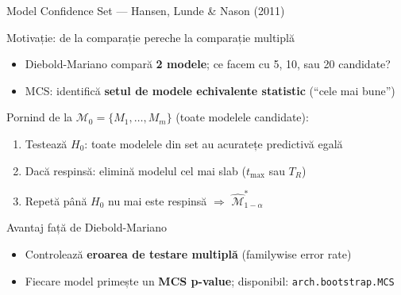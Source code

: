 \documentclass[9pt, aspectratio=169, t]{beamer}
\begin{document}
\begin{frame}{Model Confidence Set --- Hansen, Lunde \& Nason (2011)}
    \small
        \begin{block}{Motivație: de la comparație pereche la comparație multiplă}
            \begin{itemize}
                \item Diebold-Mariano compară \textbf{2 modele}; ce facem cu 5, 10, sau 20 candidate?
                \item MCS: identifică \textbf{setul de modele echivalente statistic} (``cele mai bune'')
            \end{itemize}
        \end{block}
        \vspace{-1mm}
        \begin{defn}
            Pornind de la $\mathcal{M}_0 = \{M_1, \ldots, M_m\}$ (toate modelele candidate):
            \begin{enumerate}\setlength{\itemsep}{-1pt}
                \item Testează $H_0$: toate modelele din set au acuratețe predictivă egală
                \item Dacă respinsă: elimină modelul cel mai slab ($t_{\max}$ sau $T_R$)
                \item Repetă până $H_0$ nu mai este respinsă $\Rightarrow$ $\hat{\mathcal{M}}^*_{1-\alpha}$
            \end{enumerate}
        \end{defn}
        \vspace{-1mm}
        \begin{alertblock}{Avantaj față de Diebold-Mariano}
            \begin{itemize}\setlength{\itemsep}{-1pt}
                \item Controlează \textbf{eroarea de testare multiplă} (familywise error rate)
                \item Fiecare model primește un \textbf{MCS p-value}; disponibil: \texttt{arch.bootstrap.MCS}
            \end{itemize}
        \end{alertblock}
\end{frame}
\end{document}
